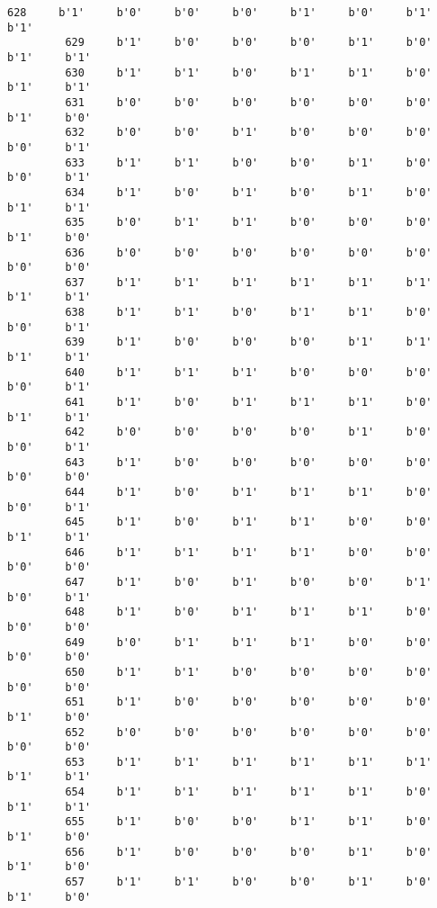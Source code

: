 \documentclass[11pt]{article}
\begin{document}
\begin{Verbatim}[commandchars=\\\{\}]
         628     b'1'     b'0'     b'0'     b'0'     b'1'     b'0'     b'1'     b'1'   
         629     b'1'     b'0'     b'0'     b'0'     b'1'     b'0'     b'1'     b'1'   
         630     b'1'     b'1'     b'0'     b'1'     b'1'     b'0'     b'1'     b'1'   
         631     b'0'     b'0'     b'0'     b'0'     b'0'     b'0'     b'1'     b'0'   
         632     b'0'     b'0'     b'1'     b'0'     b'0'     b'0'     b'0'     b'1'   
         633     b'1'     b'1'     b'0'     b'0'     b'1'     b'0'     b'0'     b'1'   
         634     b'1'     b'0'     b'1'     b'0'     b'1'     b'0'     b'1'     b'1'   
         635     b'0'     b'1'     b'1'     b'0'     b'0'     b'0'     b'1'     b'0'   
         636     b'0'     b'0'     b'0'     b'0'     b'0'     b'0'     b'0'     b'0'   
         637     b'1'     b'1'     b'1'     b'1'     b'1'     b'1'     b'1'     b'1'   
         638     b'1'     b'1'     b'0'     b'1'     b'1'     b'0'     b'0'     b'1'   
         639     b'1'     b'0'     b'0'     b'0'     b'1'     b'1'     b'1'     b'1'   
         640     b'1'     b'1'     b'1'     b'0'     b'0'     b'0'     b'0'     b'1'   
         641     b'1'     b'0'     b'1'     b'1'     b'1'     b'0'     b'1'     b'1'   
         642     b'0'     b'0'     b'0'     b'0'     b'1'     b'0'     b'0'     b'1'   
         643     b'1'     b'0'     b'0'     b'0'     b'0'     b'0'     b'0'     b'0'   
         644     b'1'     b'0'     b'1'     b'1'     b'1'     b'0'     b'0'     b'1'   
         645     b'1'     b'0'     b'1'     b'1'     b'0'     b'0'     b'1'     b'1'   
         646     b'1'     b'1'     b'1'     b'1'     b'0'     b'0'     b'0'     b'0'   
         647     b'1'     b'0'     b'1'     b'0'     b'0'     b'1'     b'0'     b'1'   
         648     b'1'     b'0'     b'1'     b'1'     b'1'     b'0'     b'0'     b'0'   
         649     b'0'     b'1'     b'1'     b'1'     b'0'     b'0'     b'0'     b'0'   
         650     b'1'     b'1'     b'0'     b'0'     b'0'     b'0'     b'0'     b'0'   
         651     b'1'     b'0'     b'0'     b'0'     b'0'     b'0'     b'1'     b'0'   
         652     b'0'     b'0'     b'0'     b'0'     b'0'     b'0'     b'0'     b'0'   
         653     b'1'     b'1'     b'1'     b'1'     b'1'     b'1'     b'1'     b'1'   
         654     b'1'     b'1'     b'1'     b'1'     b'1'     b'0'     b'1'     b'1'   
         655     b'1'     b'0'     b'0'     b'1'     b'1'     b'0'     b'1'     b'0'   
         656     b'1'     b'0'     b'0'     b'0'     b'1'     b'0'     b'1'     b'0'   
         657     b'1'     b'1'     b'0'     b'0'     b'1'     b'0'     b'1'     b'0'   

\end{Verbatim}
\end{document}

